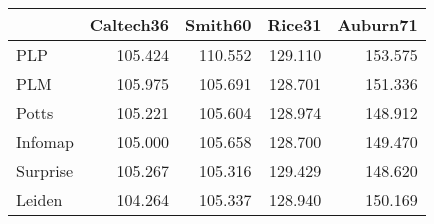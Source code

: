 \begin{tabular}{lrrrr}
\toprule
{} & Caltech36 & Smith60 &  Rice31 & Auburn71 \\
\midrule
PLP      &   105.424 & 110.552 & 129.110 &  153.575 \\
PLM      &   105.975 & 105.691 & 128.701 &  151.336 \\
Potts    &   105.221 & 105.604 & 128.974 &  148.912 \\
Infomap  &   105.000 & 105.658 & 128.700 &  149.470 \\
Surprise &   105.267 & 105.316 & 129.429 &  148.620 \\
Leiden   &   104.264 & 105.337 & 128.940 &  150.169 \\
\bottomrule
\end{tabular}
